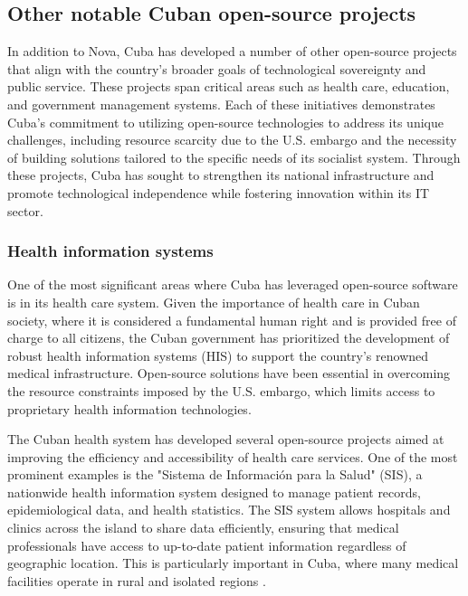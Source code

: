 \begin{refsection}
\subsection{Other notable Cuban open-source projects}

In addition to Nova, Cuba has developed a number of other open-source projects that align with the country’s broader goals of technological sovereignty and public service. These projects span critical areas such as health care, education, and government management systems. Each of these initiatives demonstrates Cuba’s commitment to utilizing open-source technologies to address its unique challenges, including resource scarcity due to the U.S. embargo and the necessity of building solutions tailored to the specific needs of its socialist system. Through these projects, Cuba has sought to strengthen its national infrastructure and promote technological independence while fostering innovation within its IT sector.

\subsubsection{Health information systems}

One of the most significant areas where Cuba has leveraged open-source software is in its health care system. Given the importance of health care in Cuban society, where it is considered a fundamental human right and is provided free of charge to all citizens, the Cuban government has prioritized the development of robust health information systems (HIS) to support the country’s renowned medical infrastructure. Open-source solutions have been essential in overcoming the resource constraints imposed by the U.S. embargo, which limits access to proprietary health information technologies.

The Cuban health system has developed several open-source projects aimed at improving the efficiency and accessibility of health care services. One of the most prominent examples is the "Sistema de Información para la Salud" (SIS), a nationwide health information system designed to manage patient records, epidemiological data, and health statistics. The SIS system allows hospitals and clinics across the island to share data efficiently, ensuring that medical professionals have access to up-to-date patient information regardless of geographic location. This is particularly important in Cuba, where many medical facilities operate in rural and isolated regions \cite[pp.~67-89]{feinberg}.


\end{refsection}
